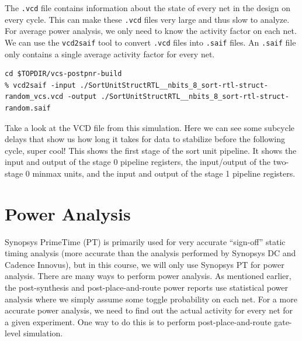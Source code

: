 \documentclass[a4paper,12pt,twoside]{article}
\begin{document}
The \texttt{.vcd} file contains information about the state of every net in the design on every cycle. This can make these \texttt{.vcd} files very large and thus slow to analyze. For average power analysis, we only need to know the activity factor on each net. We can use the \texttt{vcd2saif} tool to convert \texttt{.vcd} files into \texttt{.saif} files. An \texttt{.saif} file only contains a single average activity factor for every net.
\begin{verbatim}
cd $TOPDIR/vcs-postpnr-build
% vcd2saif -input ./SortUnitStructRTL__nbits_8_sort-rtl-struct-random_vcs.vcd -output ./SortUnitStructRTL__nbits_8_sort-rtl-struct-random.saif
\end{verbatim}
Take a look at the VCD file from this simulation. Here we can see some subcycle delays that show us how long it takes for data to stabilize before the following cycle, super cool! This shows the first stage of the sort unit pipeline. It shows the input and output of the stage 0 pipeline registers, the input/output of the two-stage 0 minmax units, and the input and output of the stage 1 pipeline registers.

\newpage
\section{Power Analysis}\label{SPA}
Synopsys PrimeTime (PT) is primarily used for very accurate “sign-off” static timing analysis (more accurate than the analysis performed by Synopsys DC and Cadence Innovus), but in this course, we will only use Synopsys PT for power analysis. There are many ways to perform power analysis. As mentioned earlier, the post-synthesis and post-place-and-route power reports use statistical power analysis where we simply assume some toggle probability on each net. For a more accurate power analysis, we need to find out the actual activity for every net for a given experiment. One way to do this is to perform post-place-and-route gate-level simulation.
\end{document}

